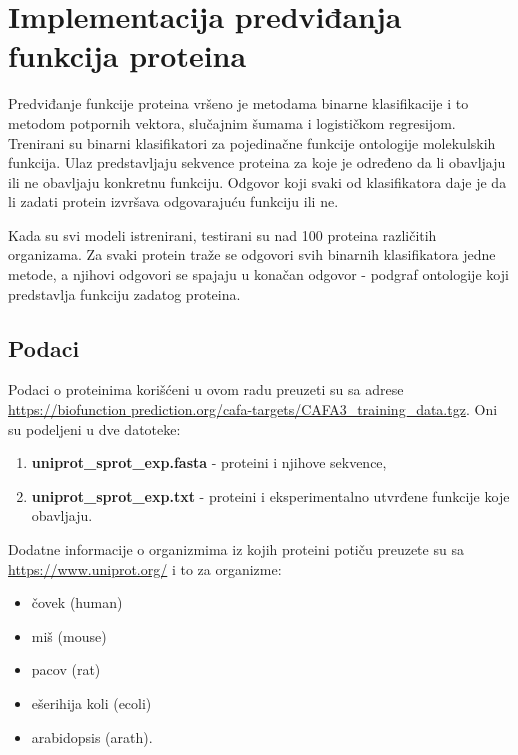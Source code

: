 \chapter{Implementacija predviđanja funkcija proteina}
\label{Chapter5}

Predviđanje funkcije proteina vršeno je metodama binarne klasifikacije i to metodom potpornih vektora, slučajnim šumama i logističkom regresijom. Trenirani su binarni klasifikatori za pojedinačne funkcije ontologije molekulskih funkcija. Ulaz predstavljaju sekvence proteina za koje je određeno da li obavljaju ili ne obavljaju konkretnu funkciju. Odgovor koji svaki od klasifikatora daje je da li zadati protein izvršava odgovarajuću funkciju ili ne.

Kada su svi modeli istrenirani, testirani su nad 100 proteina različitih organizama. Za svaki protein traže se odgovori svih binarnih klasifikatora jedne metode, a njihovi odgovori se spajaju u konačan odgovor - podgraf ontologije koji predstavlja funkciju zadatog proteina.



\section{Podaci}

Podaci o proteinima korišćeni u ovom radu preuzeti su sa adrese \href{https://biofunctionprediction.org/cafa-targets/CAFA3_training_data.tgz}{https://biofunction prediction.org/cafa-targets/CAFA3\_training\_data.tgz}. Oni su podeljeni u dve datoteke:

\begin{enumerate}
	\item \textbf{uniprot\_sprot\_exp.fasta} - proteini i njihove sekvence,
	\item \textbf{uniprot\_sprot\_exp.txt} - proteini i eksperimentalno utvrđene funkcije koje obavljaju.
\end{enumerate}

Dodatne informacije o organizmima iz kojih proteini potiču preuzete su sa \url{https://www.uniprot.org/} i to za organizme:
	\begin{itemize}
		\item čovek (human)
		\item miš (mouse)
		\item pacov (rat)
		\item ešerihija koli (ecoli)
		\item arabidopsis (arath).
	\end{itemize}


